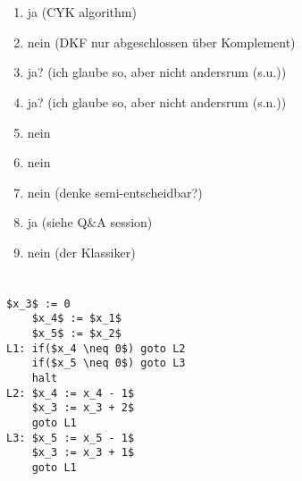 \documentclass{article}
\begin{document}
\section{}%

\section{}%
\begin{enumerate}
	\item ja (CYK algorithm)
	\item nein (DKF nur abgeschlossen über Komplement)
	\item ja? (ich glaube so, aber nicht andersrum (s.u.))
	\item ja? (ich glaube so, aber nicht andersrum (s.n.))
	\item nein 
	\item nein 
	\item nein (denke semi-entscheidbar?)
	\item ja (siehe Q\&A session)
	\item nein (der Klassiker)
\end{enumerate}

\section{}%
\begin{lstlisting}[mathescape]
    $x_3$ := 0
    $x_4$ := $x_1$
    $x_5$ := $x_2$
L1: if($x_4 \neq 0$) goto L2
    if($x_5 \neq 0$) goto L3
    halt
L2: $x_4 := x_4 - 1$
    $x_3 := x_3 + 2$
    goto L1
L3: $x_5 := x_5 - 1$
    $x_3 := x_3 + 1$ 
    goto L1
\end{lstlisting}
\end{document}
